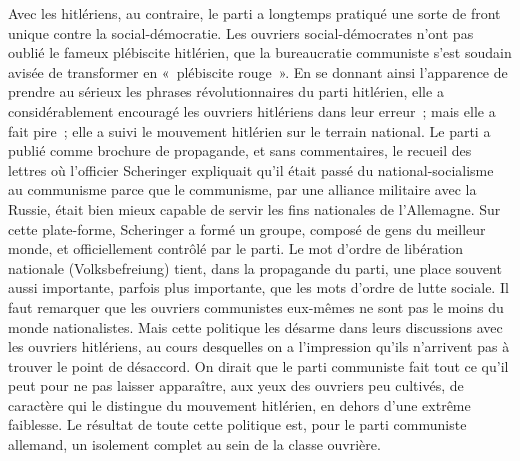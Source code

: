 \documentclass[french,twoside]{book} %
\begin{document}
Avec les hitlériens, au contraire, le parti a longtemps pratiqué une sorte de front unique contre la social-démocratie. Les ouvriers social-démocrates n'ont pas oublié le fameux plébiscite hitlérien, que la bureaucratie communiste s'est soudain avisée de transformer en « plébiscite rouge ». En se donnant ainsi l'apparence de prendre au sérieux les phrases révolutionnaires du parti hitlé­rien, elle a considérablement encouragé les ouvriers hitlériens dans leur erreur ; mais elle a fait pire ; elle a suivi le mouvement hitlérien sur le terrain national. Le parti a publié comme brochure de propagande, et sans commen­taires, le recueil des lettres où l'officier Scheringer expliquait qu'il était passé du national-socialisme au communisme parce que le communisme, par une alliance militaire avec la Russie, était bien mieux capable de servir les fins nationales de l'Allemagne. Sur cette plate-forme, Scheringer a formé un grou­pe, composé de gens du meilleur monde, et officiellement contrôlé par le parti. Le mot d'ordre de libération nationale (Volksbefreiung) tient, dans la propagande du parti, une place souvent aussi importante, parfois plus impor­tante, que les mots d'ordre de lutte sociale. Il faut remarquer que les ouvriers communistes eux-mêmes ne sont pas le moins du monde nationalistes. Mais cette politique les désarme dans leurs discussions avec les ouvriers hitlériens, au cours desquelles on a l'impression qu'ils n'arrivent pas à trouver le point de désaccord. On dirait que le parti communiste fait tout ce qu'il peut pour ne pas laisser apparaître, aux yeux des ouvriers peu cultivés, de caractère qui le distingue du mouvement hitlérien, en dehors d'une extrême faiblesse. Le résultat de toute cette politique est, pour le parti communiste allemand, un isolement complet au sein de la classe ouvrière.\par
\end{document}
